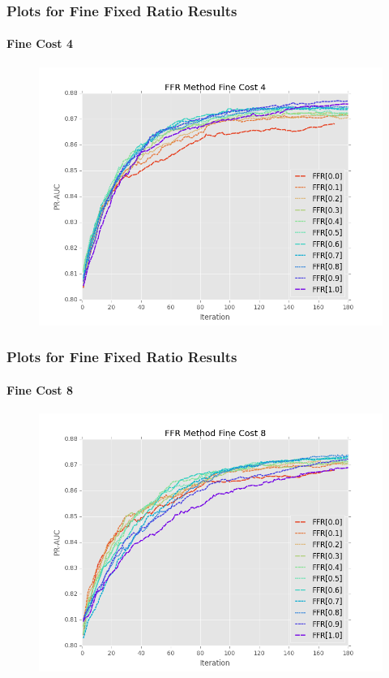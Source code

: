 \documentclass{beamer}
\begin{document}
\begin{frame}
    \frametitle{Plots for Fine Fixed Ratio Results}  %
    \framesubtitle{Fine Cost 4}
    \begin{figure}[!htb]
        \centering
        \includegraphics[width=0.8\columnwidth]{fig/ParamsFFR_PR_Cost4_rnds0_180}
        \label{fig:ParamsFFR_PR_Cost4_rnds0_180}
    \end{figure}
\end{frame}
\begin{frame}
    \frametitle{Plots for Fine Fixed Ratio Results}  %
    \framesubtitle{Fine Cost 8}
    \begin{figure}[!htb]
        \centering
        \includegraphics[width=0.8\columnwidth]{fig/ParamsFFR_PR_Cost8_rnds0_180}
        \label{fig:ParamsFFR_PR_Cost8_rnds0_180}
    \end{figure}
\end{frame}
\end{document}
